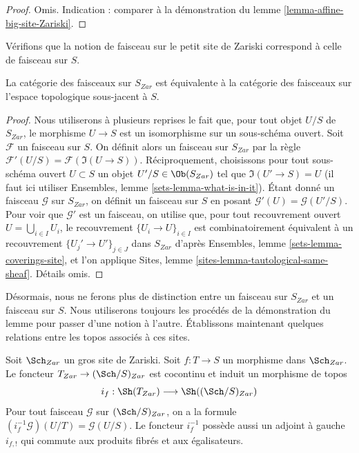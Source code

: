 \begin{proof}
Omis. Indication : comparer à la démonstration du
lemme \ref{lemma-affine-big-site-Zariski}.
\end{proof}

\noindent
Vérifions que la notion de faisceau sur le petit site de Zariski
correspond à celle de faisceau sur $S$.

\begin{lemma}
\label{lemma-Zariski-usual}
La catégorie des faisceaux sur $S_{Zar}$ est équivalente à la
catégorie des faisceaux sur l'espace topologique sous-jacent à $S$.
\end{lemma}

\begin{proof}
Nous utiliserons à plusieurs reprises le fait que, pour tout objet
$U/S$ de $S_{Zar}$, le morphisme $U \to S$ est un isomorphisme
sur un sous-schéma ouvert.
Soit $\mathcal{F}$ un faisceau sur $S$. On définit alors un faisceau
sur $S_{Zar}$ par la règle $\mathcal{F}'(U/S) = \mathcal{F}(\Im(U \to S))$.
Réciproquement, choisissons pour tout sous-schéma ouvert $U \subset S$ un objet
$U'/S \in \Ob(S_{Zar})$ tel que $\Im(U' \to S) = U$
(il faut ici utiliser Ensembles, lemme \ref{sets-lemma-what-is-in-it}).
Étant donné un faisceau $\mathcal{G}$ sur $S_{Zar}$, on définit un faisceau sur $S$ en posant
$\mathcal{G}'(U) = \mathcal{G}(U'/S)$. Pour voir que $\mathcal{G}'$ est
un faisceau, on utilise que, pour tout recouvrement ouvert $U = \bigcup_{i \in I} U_i$,
le recouvrement $\{U_i \to U\}_{i \in I}$
est combinatoirement équivalent à un recouvrement $\{U_j' \to U'\}_{j \in J}$
dans $S_{Zar}$ d'après Ensembles, lemme \ref{sets-lemma-coverings-site},
et l'on applique Sites, lemme \ref{sites-lemma-tautological-same-sheaf}.
Détails omis.
\end{proof}

\noindent
Désormais, nous ne ferons plus de distinction entre un faisceau sur
$S_{Zar}$ et un faisceau sur $S$. Nous utiliserons toujours les procédés
de la démonstration du lemme pour passer d'une notion à l'autre.
Établissons maintenant quelques relations entre les topos
associés à ces sites.

\begin{lemma}
\label{lemma-put-in-T}
Soit $\Sch_{Zar}$ un gros site de Zariski.
Soit $f : T \to S$ un morphisme dans $\Sch_{Zar}$.
Le foncteur $T_{Zar} \to (\Sch/S)_{Zar}$
est cocontinu et induit un morphisme de topos
$$
i_f :
\Sh(T_{Zar})
\longrightarrow
\Sh((\Sch/S)_{Zar})
$$
Pour tout faisceau $\mathcal{G}$ sur $(\Sch/S)_{Zar}$,
on a la formule $(i_f^{-1}\mathcal{G})(U/T) = \mathcal{G}(U/S)$.
Le foncteur $i_f^{-1}$ possède aussi un adjoint à gauche $i_{f, !}$ qui commute
aux produits fibrés et aux égalisateurs.
\end{lemma}

